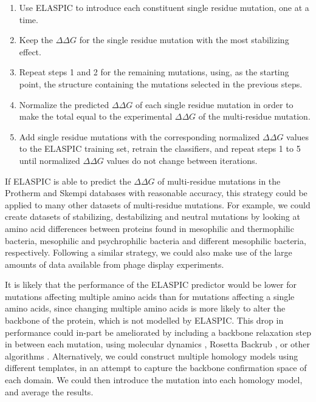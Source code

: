 \begin{enumerate}
	\itemsep0em
    \item Use ELASPIC to introduce each constituent single residue mutation, one at a time.
    \item Keep the $\Delta \Delta G$ for the single residue mutation with the most stabilizing effect.
    \item Repeat steps 1 and 2 for the remaining mutations, using, as the starting point, the structure containing the mutations selected in the previous steps.
		\item Normalize the predicted $\Delta \Delta G$ of each single residue mutation in order to make the total equal to the experimental $\Delta \Delta G$ of the multi-residue mutation.
		\item Add single residue mutations with the corresponding normalized $\Delta \Delta G$ values to the ELASPIC training set, retrain the classifiers, and repeat steps 1 to 5 until normalized $\Delta \Delta G$ values do not change between iterations.
\end{enumerate}

If ELASPIC is able to predict the $\Delta \Delta G$ of multi-residue mutations in the Protherm and Skempi databases with reasonable accuracy, this strategy could be applied to many other datasets of multi-residue mutations. For example, we could create datasets of stabilizing, destabilizing and neutral mutations by looking at amino acid differences between proteins found in mesophilic and thermophilic bacteria, mesophilic and psychrophilic bacteria and different mesophilic bacteria, respectively. Following a similar strategy, we could also make use of the large amounts of data available from phage display experiments.

It is likely that the performance of the ELASPIC predictor would be lower for mutations affecting multiple amino acids than for mutations affecting a single amino acids, since changing multiple amino acids is more likely to alter the backbone of the protein, which is not modelled by ELASPIC. This drop in performance could in-part be ameliorated by including a backbone relaxation step in between each mutation, using molecular dynamics \cite{abraham_gromacs:_2015}, Rosetta Backrub \cite{smith_predicting_2011}, or other algorithms \cite{sun_protein_2016}. Alternatively, we could construct multiple homology models using different templates, in an attempt to capture the backbone confirmation space of each domain. We could then introduce the mutation into each homology model, and average the results.
